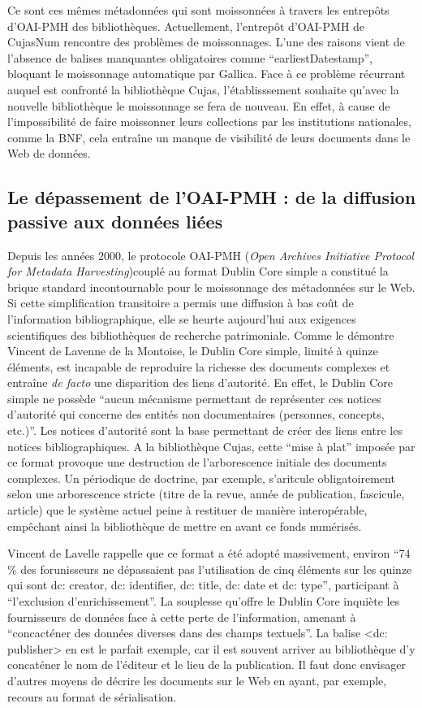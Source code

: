 Ce sont ces mêmes métadonnées qui sont moissonnées à travers les entrepôts d'OAI-PMH des bibliothèques. Actuellement, l'entrepôt d'OAI-PMH de CujasNum rencontre des problèmes de moissonnages. L'une des raisons vient de l'absence de balises manquantes obligatoires comme \enquote{earliestDatestamp}, bloquant le moissonnage automatique par Gallica. Face à ce problème récurrant auquel est confronté la bibliothèque Cujas, l'établisssement souhaite qu'avec la nouvelle bibliothèque le moissonnage se fera de nouveau. En effet, à cause de l'impossibilité de faire moissonner leurs collections par les institutions nationales, comme la BNF, cela entraîne un manque de visibilité de leurs documents dans le Web de données.

\subsection{Le dépassement de l'OAI-PMH : de la diffusion passive aux données liées}
Depuis les années 2000, le protocole OAI-PMH (\textit{Open Archives Initiative Protocol for Metadata Harvesting})couplé au format Dublin Core simple a constitué la brique standard incontournable pour le moissonnage des métadonnées sur le Web. Si cette simplification transitoire a permis une diffusion à bas coût de l'information bibliographique, elle se heurte aujourd'hui aux exigences scientifiques des bibliothèques de recherche patrimoniale. Comme le démontre Vincent de Lavenne de la Montoise, le Dublin Core simple, limité à quinze éléments, est incapable de reproduire la richesse des documents complexes et entraîne \textit{de facto} une disparition des liens d'autorité. En effet, le Dublin Core simple ne possède \enquote{aucun mécanisme permettant de représenter ces notices d'autorité qui concerne des entités non documentaires (personnes, concepts, etc.)}. Les notices d'autorité sont la base permettant de créer des liens entre les notices bibliographiques. A la bibliothèque Cujas, cette \enquote{mise à plat} imposée par ce format provoque une destruction de l'arborescence initiale des documents complexes. Un périodique de doctrine, par exemple, s'aritcule obligatoirement selon une arborescence stricte  (titre de la revue, année de publication, fascicule, article) que le système actuel peine à restituer de manière interopérable, empêchant ainsi la bibliothèque de mettre en avant ce fonds numérisés.

Vincent de Lavelle rappelle que ce format a été adopté massivement, environ \enquote{74 \% des forunisseurs ne dépassaient pas l'utilisation de cinq éléments sur les quinze qui sont dc: creator, dc: identifier, dc: title, dc: date et dc: type}, participant à \enquote{l'exclusion d'enrichissement}. La souplesse qu'offre le Dublin Core inquiète les fournisseurs de données face à cette perte de l'information, amenant à \enquote{concacténer des données diverses dans des champs textuels}. La balise <dc: publisher> en est le parfait exemple, car il est souvent arriver au bibliothèque d'y concaténer le nom de l'éditeur et le lieu de la publication. Il faut donc envisager d'autres moyens de décrire les documents sur le Web en ayant, par exemple, recours au format de sérialisation.


